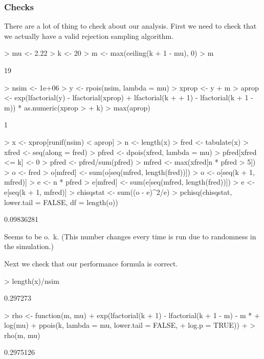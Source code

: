 \documentclass[11pt]{article}
\begin{document}
\subsubsection{Checks}

There are a lot of thing to check about our analysis.
First we need to check that we actually have a valid rejection sampling
algorithm.
\begin{Schunk}
\begin{Sinput}
> mu <- 2.22
> k <- 20
> m <- max(ceiling(k + 1 - mu), 0)
> m
\end{Sinput}
\begin{Soutput}
[1] 19
\end{Soutput}
\begin{Sinput}
> nsim <- 1e+06
> y <- rpois(nsim, lambda = mu)
> xprop <- y + m
> aprop <- exp(lfactorial(y) - lfactorial(xprop) + lfactorial(k + 
+     1) - lfactorial(k + 1 - m)) * as.numeric(xprop > 
+     k)
> max(aprop)
\end{Sinput}
\begin{Soutput}
[1] 1
\end{Soutput}
\begin{Sinput}
> x <- xprop[runif(nsim) < aprop]
> n <- length(x)
> fred <- tabulate(x)
> xfred <- seq(along = fred)
> pfred <- dpois(xfred, lambda = mu)
> pfred[xfred <= k] <- 0
> pfred <- pfred/sum(pfred)
> mfred <- max(xfred[n * pfred > 5])
> o <- fred
> o[mfred] <- sum(o[seq(mfred, length(fred))])
> o <- o[seq(k + 1, mfred)]
> e <- n * pfred
> e[mfred] <- sum(e[seq(mfred, length(fred))])
> e <- e[seq(k + 1, mfred)]
> chisqstat <- sum((o - e)^2/e)
> pchisq(chisqstat, lower.tail = FALSE, df = length(o))
\end{Sinput}
\begin{Soutput}
[1] 0.09836281
\end{Soutput}
\end{Schunk}
Seems to be o.~k.  (This number changes every time \verb@Sweave@ is run
due to randomness in the simulation.)

Next we check that our performance formula is correct.
\begin{Schunk}
\begin{Sinput}
> length(x)/nsim
\end{Sinput}
\begin{Soutput}
[1] 0.297273
\end{Soutput}
\begin{Sinput}
> rho <- function(m, mu) {
+     exp(lfactorial(k + 1) - lfactorial(k + 1 - m) - m * 
+         log(mu) + ppois(k, lambda = mu, lower.tail = FALSE, 
+         log.p = TRUE))
+ }
> rho(m, mu)
\end{Sinput}
\begin{Soutput}
[1] 0.2975126
\end{Soutput}
\end{Schunk}
\end{document}
